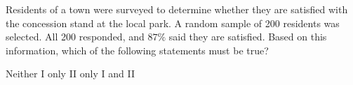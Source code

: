 \question[1]
Residents of a town were surveyed to determine whether they are satisfied with the concession stand at the local park. A random sample of 200 residents was selected. All 200 responded, and $87\%$ said they are satisfied. Based on this information, which of the following statements must be true?
\begin{choices}
  \CorrectChoice Neither
  \choice I only
  \choice II only
  \choice I and II
\end{choices}

